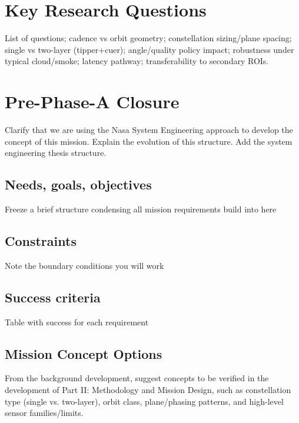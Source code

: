 \section{Key Research
Questions}\label{53-key-research-questions}

List of questions; cadence vs orbit geometry; constellation sizing/plane
spacing; single vs two-layer (tipper+cuer); angle/quality policy impact;
robustness under typical cloud/smoke; latency pathway; transferability
to secondary ROIs.

\section{\texorpdfstring{Pre-Phase-A Closure
}{Pre-Phase-A Closure }}\label{54-pre-phase-a-closure}

Clarify that we are using the Nasa System Engineering approach to
develop the concept of this mission. Explain the evolution of this
structure. Add the system engineering thesis structure.

\subsection{Needs, goals,
objectives}\label{541-needs-goals-objectives}

Freeze a brief structure condensing all mission requirements build into
here

\subsection{Constraints}\label{542-constraints}

Note the boundary conditions you will work

\subsection{Success criteria}\label{543-success-criteria}

Table with success for each requirement

\subsection{Mission Concept
Options}\label{544-mission-concept-options}

From the background development, suggest concepts to be verified in the
development of Part II: Methodology and Mission Design, such as
constellation type (single vs. two-layer), orbit class, plane/phasing
patterns, and high-level sensor families/limits.

